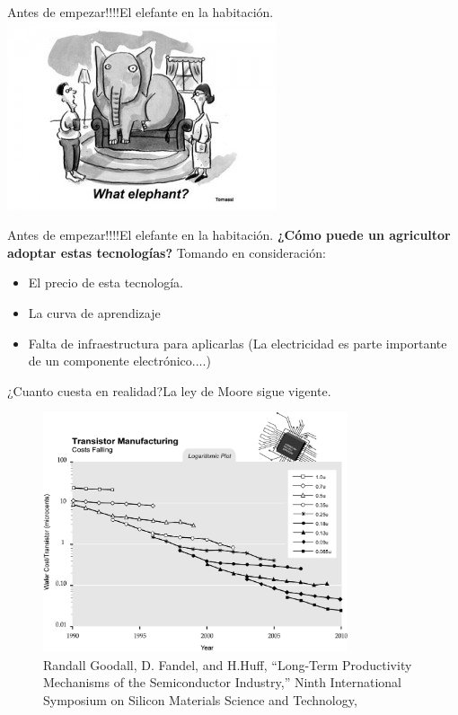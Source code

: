 \documentclass[]{beamer}
\begin{document}
\begin{frame}{Antes de empezar!!!!}{El elefante en la habitación.}
  \includegraphics{Docs/elefant_in_room}
\end{frame}

\begin{frame}{Antes de empezar!!!!}{El elefante en la habitación.}
  \textbf{¿Cómo puede un agricultor adoptar estas tecnologías?}
  Tomando en consideración:
  \begin{itemize}
    \item El precio de esta tecnología.
    \item La curva de aprendizaje
    \item Falta de infraestructura para aplicarlas (La electricidad es parte importante de un componente electrónico....)
  \end{itemize}
\end{frame}

\begin{frame}{¿Cuanto cuesta en realidad?}{La ley de Moore sigue vigente.}
  \begin{figure}
    \includegraphics[width=0.8\textwidth]{Docs/Trans_price}
    \caption{\tiny Randall Goodall, D. Fandel, and H.Huff, “Long-Term Productivity Mechanisms of the Semiconductor Industry,” Ninth International Symposium on Silicon Materials Science and Technology, }
    \label{Moore_law}
  \end{figure}
\end{frame}
\end{document}
